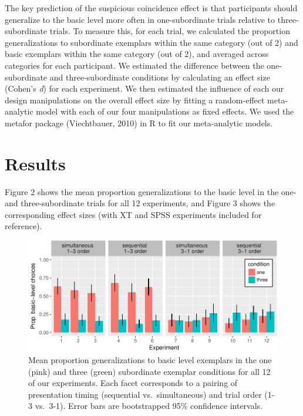 \documentclass[english,floatsintext,man]{apa6}
\theoremstyle{definition}
\theoremstyle{definition}
\theoremstyle{remark}
\begin{document}
The key prediction of the suspicious coincidence effect is that
participants should generalize to the basic level more often in
one-subordinate trials relative to three-subordinate trials. To measure
this, for each trial, we calculated the proportion generalizations to
subordinate exemplars within the same category (out of 2) and basic
exemplars within the same category (out of 2), and averaged across
categories for each participant. We estimated the difference between the
one-subordinate and three-subordinate conditions by calculating an
effect size (Cohen's \emph{d}) for each experiment. We then estimated
the influence of each our design manipulations on the overall effect
size by fitting a random-effect meta-analytic model with each of our
four manipulations as fixed effects. We used the metafor package
(Viechtbauer, 2010) in R to fit our meta-analytic models.

\section{Results}\label{results}

Figure 2 shows the mean proportion generalizations to the basic level in
the one- and three-subordinate trials for all 12 experiments, and Figure
3 shows the corresponding effect sizes (with XT and SPSS experiments
included for reference).

\begin{figure}
\centering
\includegraphics{xtmem_files/figure-latex/unnamed-chunk-4-1.pdf}
\caption{\label{fig:unnamed-chunk-4}Mean proportion generalizations to basic
level exemplars in the one (pink) and three (green) subordinate exemplar
conditions for all 12 of our experiments. Each facet corresponds to a
pairing of presentation timing (sequential vs.~simultaneous) and trial
order (1-3 vs.~3-1). Error bars are bootstrapped 95\% confidence
intervals.}
\end{figure}
\end{document}
